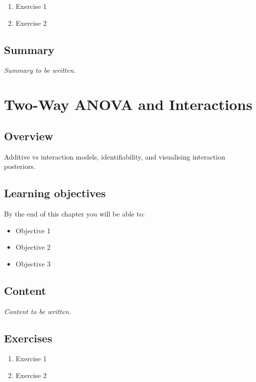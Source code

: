 \documentclass[
  11pt,
  a4paper,
  oneside,
  openany]{scrbook}
\providecommand{\tightlist}{%
  \setlength{\itemsep}{0pt}\setlength{\parskip}{0pt}}\usepackage{longtable,booktabs,array}
\begin{document}
\begin{enumerate}
\def\labelenumi{\arabic{enumi}.}
\tightlist
\item
  Exercise 1
\item
  Exercise 2
\end{enumerate}

\section{Summary}\label{summary-5}

\emph{Summary to be written.}

\chapter{Two-Way ANOVA and
Interactions}\label{two-way-anova-and-interactions}

\section{Overview}\label{overview-6}

Additive vs interaction models, identifiability, and visualising
interaction posteriors.

\section{Learning objectives}\label{learning-objectives-6}

By the end of this chapter you will be able to:

\begin{itemize}
\tightlist
\item[$\square$]
  Objective 1
\item[$\square$]
  Objective 2
\item[$\square$]
  Objective 3
\end{itemize}

\section{Content}\label{content-5}

\emph{Content to be written.}

\section{Exercises}\label{exercises-6}

\begin{enumerate}
\def\labelenumi{\arabic{enumi}.}
\tightlist
\item
  Exercise 1
\item
  Exercise 2
\end{enumerate}
\end{document}

